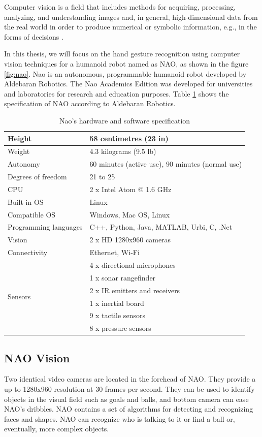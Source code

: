 Computer vision is a field that includes methods for acquiring, processing, analyzing, and understanding images and, in general, high-dimensional data from the real world in order to produce numerical or symbolic information, e.g., in the forms of decisions \cite{1}.

In this thesis, we will focus on the hand gesture recognition using computer vision techniques for a humanoid robot named as NAO, as shown in the figure \ref{fig:nao}. Nao is an autonomous, programmable humanoid robot developed by Aldebaran Robotics. The Nao Academics Edition was developed for universities and laboratories for research and education purposes. Table \ref{tb:nao} shows the specification of NAO according to Aldebaran Robotics.
\begin{table}
	[h] \centering \caption{Nao's hardware and software specification } \label{tb:nao} 
	\begin{tabular}
		{|l|l|} \hline Height & 58 centimetres (23 in) \\
		\hline Weight & 4.3 kilograms (9.5 lb) \\
		\hline Autonomy & 60 minutes (active use), 90 minutes (normal use) \\
		\hline Degrees of freedom & 21 to 25 \\
		\hline CPU & 2 x Intel Atom @ 1.6 GHz \\
		\hline Built-in OS & Linux \\
		\hline Compatible OS & Windows, Mac OS, Linux \\
		\hline Programming languages & C++, Python, Java, MATLAB, Urbi, C, .Net \\
		\hline Vision & 2 x HD 1280x960 cameras \\
		\hline Connectivity & Ethernet, Wi-Fi \\
		\hline \multirow{6}{*}{Sensors} & 4 x directional microphones \\
		& 1 x sonar rangefinder \\
		& 2 x IR emitters and receivers \\
		& 1 x inertial board \\
		& 9 x tactile sensors \\
		& 8 x pressure sensors \\
		\hline 
	\end{tabular}
\end{table}

\subsection{NAO Vision} Two identical video cameras are located in the forehead of NAO. They provide a up to 1280x960 resolution at 30 frames per second. They can be used to identify objects in the visual field such as goals and balls, and bottom camera can ease NAO's dribbles. NAO contains a set of algorithms for detecting and recognizing faces and shapes. NAO can recognize who is talking to it or find a ball or, eventually, more complex objects.

